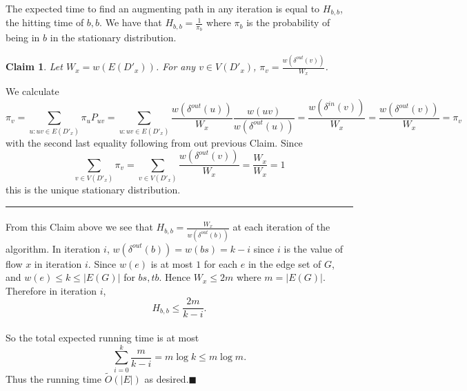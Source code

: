 \documentclass[letterpaper,12pt,oneside,onecolumn]{article}
\newenvironment{proof}{{\bf Proof:  }}{\hfill\rule{2mm}{2mm}}
\newtheorem{claim}[fact]{Claim}
\begin{document}
	\paragraph{}
	The expected time to find an augmenting path in any iteration is equal to $H_{b,b}$, the hitting time of $b,b$. We have that $H_{b,b} = \frac{1}{\pi_b}$ where $\pi_b$ is the probability of being in $b$ in the stationary distribution.
	\begin{claim}
		Let $W_x = w(E(D'_x))$. For any $v \in V(D'_x)$, $\pi_v = \frac{w(\delta^{out}(v))}{W_x}$.
	\end{claim}
	\begin{proof}
		We calculate
		$$\pi_v = \sum_{u: uv \in E(D'_x)} \pi_uP_{uv} = \sum_{u:uv \in E(D'_x)} \frac{w(\delta^{out}(u))}{W_x}\frac{w(uv)}{w(\delta^{out}(u))} = \frac{w(\delta^{in}(v))}{W_x} = \frac{w(\delta^{out}(v))}{W_x} = \pi_v$$
		with the second last equality following from out previous Claim. Since 
		$$\sum_{v \in V(D'_x)} \pi_v = \sum_{v\in V(D'_x)} \frac{w(\delta^{out}(v))}{W_x} = \frac{W_x}{W_x} = 1$$
		this is the unique stationary distribution.
	\end{proof}
	\paragraph{}
	From this Claim above we see that $H_{b,b} = \frac{W_x}{w(\delta^{out}(b))}$ at each iteration of the algorithm.
	In iteration $i$, $w(\delta^{out}(b)) = w(bs) = k-i$ since $i$ is the value of flow $x$ in iteration $i$. Since $w(e)$ is at most $1$ for each $e$ in the edge set of $G$, and $w(e) \leq k\leq |E(G)|$ for $bs, tb$. Hence $W_x \leq 2m$ where $m = |E(G)|$. Therefore in iteration $i$,
	$$H_{b,b} \leq \frac{2m}{k-i}.$$
	\paragraph{}
	So the total expected running time is at most
	$$\sum_{i=0}^k\frac{m}{k-i} = m\log k \leq m\log m.$$
	Thus the running time $\tilde{O}(|E|)$ as desired.$\blacksquare$
	\newpage
	\section{}
\end{document}
